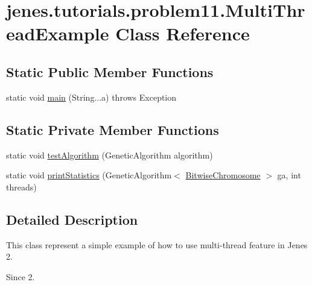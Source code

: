 \hypertarget{classjenes_1_1tutorials_1_1problem11_1_1_multi_thread_example}{\section{jenes.\-tutorials.\-problem11.\-Multi\-Thread\-Example Class Reference}
\label{classjenes_1_1tutorials_1_1problem11_1_1_multi_thread_example}
}
\subsection*{Static Public Member Functions}
\begin{DoxyCompactItemize}
\item 
static void \hyperlink{classjenes_1_1tutorials_1_1problem11_1_1_multi_thread_example_a78352360229430486f32eb26551cb118}{main} (String...\-a)  throws Exception
\end{DoxyCompactItemize}
\subsection*{Static Private Member Functions}
\begin{DoxyCompactItemize}
\item 
static void \hyperlink{classjenes_1_1tutorials_1_1problem11_1_1_multi_thread_example_ae91145d0cc52916c06ac3d900e1697a5}{test\-Algorithm} (Genetic\-Algorithm algorithm)
\item 
static void \hyperlink{classjenes_1_1tutorials_1_1problem11_1_1_multi_thread_example_ae67c60decc2c38064305d29b18163bea}{print\-Statistics} (Genetic\-Algorithm$<$ \hyperlink{classjenes_1_1chromosome_1_1_bitwise_chromosome}{Bitwise\-Chromosome} $>$ ga, int threads)
\end{DoxyCompactItemize}


\subsection{Detailed Description}
This class represent a simple example of how to use multi-\/thread feature in Jenes 2.

\begin{DoxySince}{Since}
2. 
\end{DoxySince}


